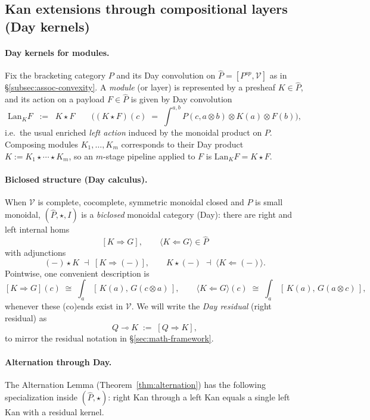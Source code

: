 \documentclass[11pt]{article}
\numberwithin{equation}{section}
\theoremstyle{upright}
\newcommand{\V}{\mathcal{V}}
\newcommand{\Lan}{\mathrm{Lan}}
\begin{document}
\subsection{Kan extensions through compositional layers (Day kernels)}
\label{subsec:kan-through-day}

\paragraph{Day kernels for modules.}
Fix the bracketing category $P$ and its Day convolution on $\widehat P=[P^{op},\V]$ as in \S\ref{subsec:assoc-convexity}.
A \emph{module} (or layer) is represented by a presheaf $K\in\widehat P$, and its action on a payload
$F\in\widehat P$ is given by Day convolution
\[
\Lan_{K}F \;\;:=\;\; K\star F
\qquad
\bigl((K\star F)(c) \;=\; \textstyle\int^{a,b} P(c,a\otimes b)\otimes K(a)\otimes F(b)\bigr),
\]
i.e.\ the usual enriched \emph{left action} induced by the monoidal product on $P$.
Composing modules $K_1,\dots,K_m$ corresponds to their Day product
$K:=K_1\star\cdots\star K_m$, so an $m$-stage pipeline applied to $F$ is $\Lan_KF=K\star F$.

\paragraph{Biclosed structure (Day calculus).}
When $\V$ is complete, cocomplete, symmetric monoidal closed and $P$ is small monoidal,
$(\widehat P,\star,I)$ is a \emph{biclosed} monoidal category (Day):
there are right and left internal homs
\[
[K\Rightarrow G],\qquad \langle K\Leftarrow G\rangle\in\widehat P
\]
with adjunctions
\[
(-)\star K \;\dashv\; [K\Rightarrow(-)],
\qquad
K\star(-) \;\dashv\; \langle K\Leftarrow(-)\rangle.
\]
Pointwise, one convenient description is
\[
[K\Rightarrow G](c)\;\cong\;\int_{a}\,[\,K(a),\,G(c\otimes a)\,],
\qquad
\langle K\Leftarrow G\rangle(c)\;\cong\;\int_{a}\,[\,K(a),\,G(a\otimes c)\,],
\]
whenever these (co)ends exist in $\V$.
We will write the \emph{Day residual} (right residual) as
\[
Q\multimap K \;:=\; [Q\Rightarrow K],
\]
to mirror the residual notation in \S\ref{sec:math-framework}.

\paragraph{Alternation through Day.}
The Alternation Lemma (Theorem~\ref{thm:alternation}) has the following specialization
inside $(\widehat P,\star)$: right Kan through a left Kan equals a single left Kan
with a residual kernel.
\end{document}
